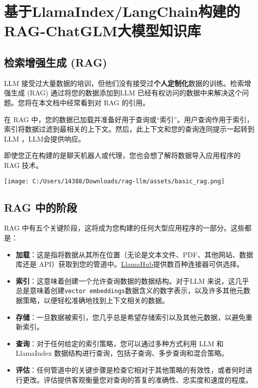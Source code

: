 \documentclass[
]{article}
\author{}
\date{}
\begin{document}
\section{基于LlamaIndex/LangChain构建的RAG-ChatGLM大模型知识库}\label{ux57faux4e8ellamaindexlangchainux6784ux5efaux7684rag-chatglmux5927ux6a21ux578bux77e5ux8bc6ux5e93}

\subsection{检索增强生成
(RAG)}\label{ux68c0ux7d22ux589eux5f3aux751fux6210-rag}

LLM
接受过大量数据的培训，但他们没有接受过\textbf{个人定制化}数据的训练。检索增强生成
(RAG) 通过将您的数据添加到LLM
已经有权访问的数据中来解决这个问题。您将在本文档中经常看到对 RAG
的引用。

在 RAG
中，您的数据已加载并准备好用于查询或``索引''。用户查询作用于索引，索引将数据过滤到最相关的上下文。然后，此上下文和您的查询连同提示一起转到LLM
，LLM会提供响应。

即使您正在构建的是聊天机器人或代理，您也会想了解将数据导入应用程序的 RAG
技术。

\texttt{[image: C:/Users/14388/Downloads/rag-llm/assets/basic\_rag.png]}

\subsection{RAG 中的阶段}\label{rag-ux4e2dux7684ux9636ux6bb5}

RAG
中有五个关键阶段，这将成为您构建的任何大型应用程序的一部分。这些都是：

\begin{itemize}
\item
  \textbf{加载}：这是指将数据从其所在位置（无论是文本文件、PDF、其他网站、数据库还是
  API）获取到您的管道中。\href{https://llamahub.ai/}{LlamaHub}提供数百种连接器可供选择。
\item
  \textbf{索引}：这意味着创建一个允许查询数据的数据结构。对于LLM
  来说，这几乎总是意味着创建\texttt{vector\ embeddings}数据含义的数字表示，以及许多其他元数据策略，以便轻松准确地找到上下文相关的数据。
\item
  \textbf{存储}：一旦数据被索引，您几乎总是希望存储索引以及其他元数据，以避免重新索引。
\item
  \textbf{查询}：对于任何给定的索引策略，您可以通过多种方式利用 LLM 和
  LlamaIndex 数据结构进行查询，包括子查询、多步查询和混合策略。
\item
  \textbf{评估}：任何管道中的关键步骤是检查它相对于其他策略的有效性，或者何时进行更改。评估提供客观衡量您对查询的答复的准确性、忠实度和速度的程度。
\end{itemize}
\end{document}
